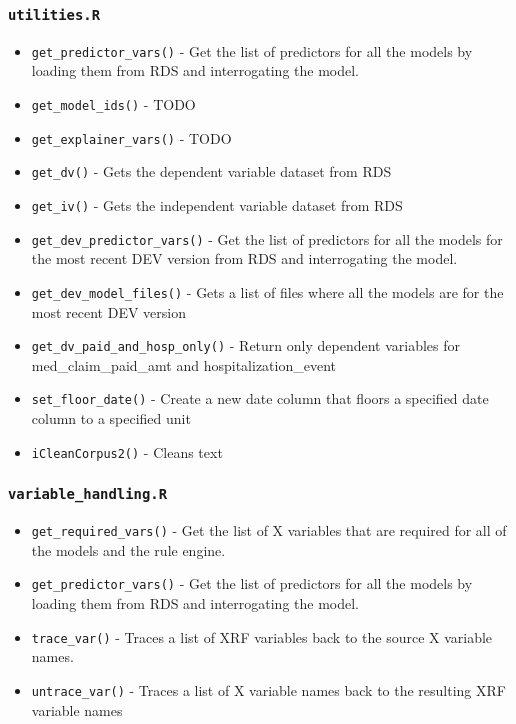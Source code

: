 \documentclass[
]{book}
\providecommand{\tightlist}{%
  \setlength{\itemsep}{0pt}\setlength{\parskip}{0pt}}
\begin{document}
\hypertarget{utilities.r}{%
\subsubsection{\texorpdfstring{\texttt{utilities.R}}{utilities.R}}\label{utilities.r}}

\begin{itemize}
\tightlist
\item
  \texttt{get\_predictor\_vars()} - Get the list of predictors for all the models by loading them from RDS and interrogating the model.
\item
  \texttt{get\_model\_ids()} - TODO
\item
  \texttt{get\_explainer\_vars()} - TODO
\item
  \texttt{get\_dv()} - Gets the dependent variable dataset from RDS
\item
  \texttt{get\_iv()} - Gets the independent variable dataset from RDS
\item
  \texttt{get\_dev\_predictor\_vars()} - Get the list of predictors for all the models for the most recent DEV version from RDS and interrogating the model.
\item
  \texttt{get\_dev\_model\_files()} - Gets a list of files where all the models are for the most recent DEV version
\item
  \texttt{get\_dv\_paid\_and\_hosp\_only()} - Return only dependent variables for med\_claim\_paid\_amt and hospitalization\_event
\item
  \texttt{set\_floor\_date()} - Create a new date column that floors a specified date column to a specified unit
\item
  \texttt{iCleanCorpus2()} - Cleans text
\end{itemize}

\hypertarget{variable_handling.r}{%
\subsubsection{\texorpdfstring{\texttt{variable\_handling.R}}{variable\_handling.R}}\label{variable_handling.r}}

\begin{itemize}
\tightlist
\item
  \texttt{get\_required\_vars()} - Get the list of X variables that are required for all of the models and the rule engine.
\item
  \texttt{get\_predictor\_vars()} - Get the list of predictors for all the models by loading them from RDS and interrogating the model.
\item
  \texttt{trace\_var()} - Traces a list of XRF variables back to the source X variable names.
\item
  \texttt{untrace\_var()} - Traces a list of X variable names back to the resulting XRF variable names
\end{itemize}
\end{document}
